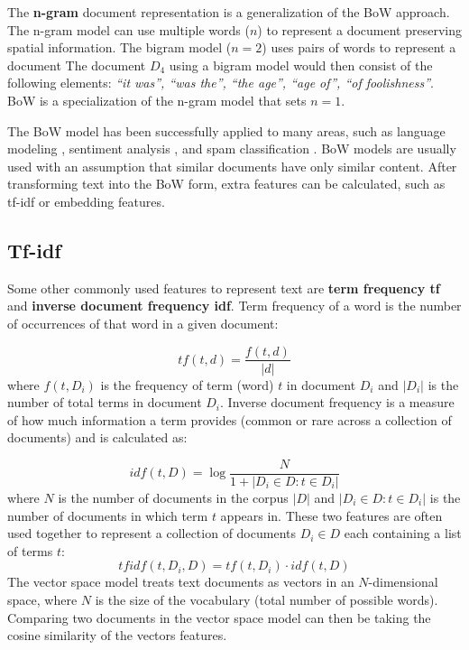 The \textbf{n-gram} document representation is a generalization of the BoW
approach. The n-gram model
can use multiple words ($n$) to represent a document preserving spatial information.
The bigram model ($n = 2$) uses pairs of words to represent a document
The document $D_4$ using a bigram model would then consist of the following 
elements:
\emph{``it was'', ``was the'', ``the age'', ``age of'', ``of foolishness''}.
BoW is a specialization of the n-gram model
that sets $n=1$. 

The BoW model has been successfully applied to many areas, such as language
modeling \citep{tirilly2008language}, sentiment analysis
\citep{wang2014microblog}, and spam classification \citep{kolari2006detecting}.
BoW models are
usually used with an assumption that similar documents have only similar
content. After transforming text into the BoW form, extra features can be
calculated, such as tf-idf or embedding features. 

\subsection{Tf-idf}
\label{sec:tf-idf}
Some other commonly used features  to represent text are \textbf{term frequency
tf} and \textbf{inverse document frequency idf}. Term frequency of a word is
the number of occurrences of that word in a given document:

$$
\mathit{tf}(t, d) = \frac{f(t, d)}{|d|}
$$
where $f(t, D_i)$ is the frequency of term (word) $t$ in document $D_i$ and $|D_i|$ is the number
of total terms in document $D_i$.
Inverse document frequency is a measure of how much information a term provides (common or rare
across a collection of documents) and is calculated as:

\begin{equation}
	\label{eq:idf}
\mathit{idf}(t, D) = \log \frac{N}{1 + |D_i \in D: t \in D_i|}
\end{equation}
where $N$ is the number of documents in the corpus $|D|$ and $|D_i \in D: t \in D_i|$ is the 
number of documents in which term $t$ appears in. 
These two features are often used together to represent a collection of documents 
$D_i \in D$ each containing a list of terms $t$:
$$
\mathit{tfidf} (t, D_i, D) = \mathit{tf}(t, D_i) \cdot \mathit{idf}(t, D)
$$
The vector space model \citep{meadow1992text} treats text documents as vectors  
in an $N$-dimensional space, where $N$ is the size of the vocabulary (total number of 
possible words). Comparing two documents in the vector space model can then be taking the
cosine similarity of the vectors features.

